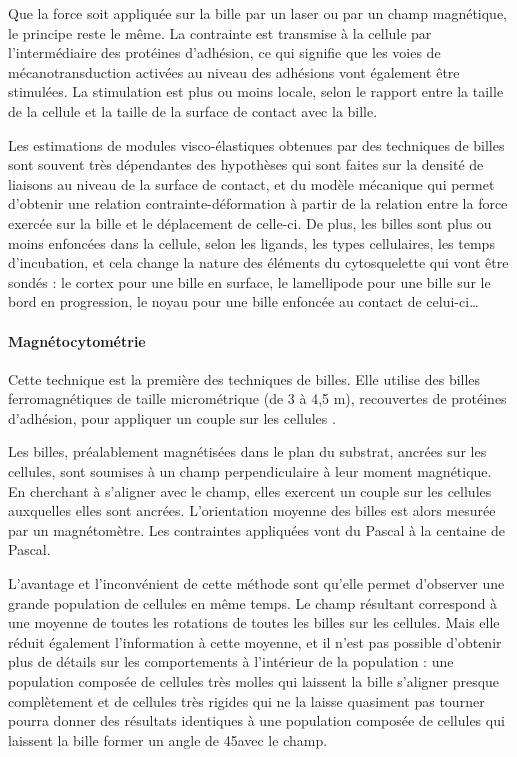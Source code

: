 Que la force soit appliquée sur la bille par un laser ou par un champ magnétique, le principe reste le même. La contrainte est transmise à la cellule par l'intermédiaire des protéines d'adhésion, ce qui signifie que les voies de mécanotransduction activées au niveau des adhésions vont également être stimulées. 
La stimulation est plus ou moins locale, selon le rapport entre la taille de la cellule et la taille de la surface de contact avec la bille.

Les estimations de modules visco-élastiques obtenues par des techniques de billes sont souvent très dépendantes des hypothèses qui sont faites sur la densité de liaisons au niveau de la surface de contact, et du modèle mécanique qui permet d'obtenir une relation contrainte-déformation à partir de la relation entre la force exercée sur la bille et le déplacement de celle-ci. 
De plus, les billes sont plus ou moins enfoncées dans la cellule, selon les ligands, les types cellulaires, les temps d'incubation, et cela change la nature des éléments du cytosquelette qui vont être sondés : le cortex pour une bille en surface, le lamellipode pour une bille sur le bord en progression, le noyau pour une bille enfoncée au contact de celui-ci\dots


\paragraph{Magnétocytométrie}

Cette technique est la première des techniques de billes. Elle utilise des billes ferromagnétiques de taille micrométrique (de 3 à 4,5 \micro m), recouvertes de protéines d'adhésion, pour appliquer un couple sur les cellules \parencite{wang_mechanotransduction_1993}.

Les billes, préalablement magnétisées dans le plan du substrat, ancrées sur les cellules, sont soumises à un champ perpendiculaire à leur moment magnétique. En cherchant à s'aligner avec le champ, elles exercent un couple sur les cellules auxquelles elles sont ancrées. L'orientation moyenne des billes est alors mesurée par un magnétomètre. Les contraintes appliquées vont du Pascal à la centaine de Pascal. 

L'avantage et l'inconvénient de cette méthode sont qu'elle permet d'observer une grande population de cellules en même temps. Le champ résultant correspond à une moyenne de toutes les rotations de toutes les billes sur les cellules. Mais elle réduit également l'information à cette moyenne, et il n'est pas possible d'obtenir plus de détails sur les comportements à l'intérieur de la population : une population composée de cellules très molles qui laissent la bille s'aligner presque complètement et de cellules très rigides qui ne la laisse quasiment pas tourner pourra donner des résultats identiques à une population composée de cellules qui laissent la bille former un angle de 45\degres avec le champ. 

